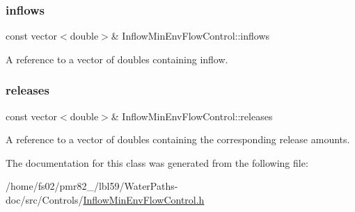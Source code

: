 \subsubsection{\texorpdfstring{inflows}{inflows}}
{\footnotesize\ttfamily const vector$<$double$>$\& Inflow\+Min\+Env\+Flow\+Control\+::inflows}



A reference to a vector of doubles containing inflow. 

\mbox{\label{classInflowMinEnvFlowControl_a2f82b53516516be63eb169d377df1f55}} 
\subsubsection{\texorpdfstring{releases}{releases}}
{\footnotesize\ttfamily const vector$<$double$>$\& Inflow\+Min\+Env\+Flow\+Control\+::releases}



A reference to a vector of doubles containing the corresponding release amounts. 



The documentation for this class was generated from the following file\+:\begin{DoxyCompactItemize}
\item 
/home/fs02/pmr82\+\_/lbl59/\+Water\+Paths-\/doc/src/\+Controls/\mbox{\hyperlink{InflowMinEnvFlowControl_8h}{Inflow\+Min\+Env\+Flow\+Control.\+h}}\end{DoxyCompactItemize}
